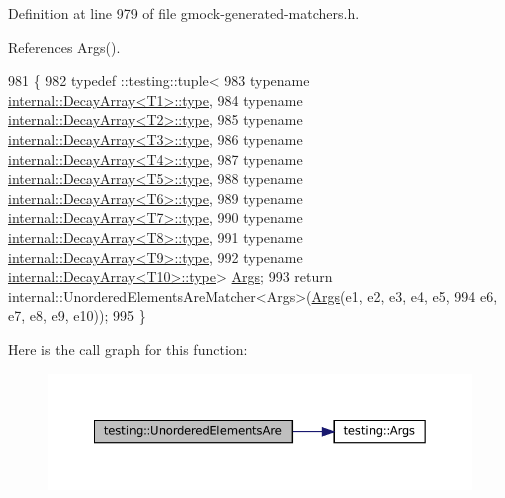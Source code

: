 Definition at line 979 of file gmock-\/generated-\/matchers.\+h.



References Args().


\begin{DoxyCode}
981                     \{
982   typedef ::testing::tuple<
983       \textcolor{keyword}{typename} \hyperlink{namespacegenerate__debs_a50bc9a7ecac9584553e089a448bcde58}{internal::DecayArray<T1>::type},
984       \textcolor{keyword}{typename} \hyperlink{namespacegenerate__debs_a50bc9a7ecac9584553e089a448bcde58}{internal::DecayArray<T2>::type},
985       \textcolor{keyword}{typename} \hyperlink{namespacegenerate__debs_a50bc9a7ecac9584553e089a448bcde58}{internal::DecayArray<T3>::type},
986       \textcolor{keyword}{typename} \hyperlink{namespacegenerate__debs_a50bc9a7ecac9584553e089a448bcde58}{internal::DecayArray<T4>::type},
987       \textcolor{keyword}{typename} \hyperlink{namespacegenerate__debs_a50bc9a7ecac9584553e089a448bcde58}{internal::DecayArray<T5>::type},
988       \textcolor{keyword}{typename} \hyperlink{namespacegenerate__debs_a50bc9a7ecac9584553e089a448bcde58}{internal::DecayArray<T6>::type},
989       \textcolor{keyword}{typename} \hyperlink{namespacegenerate__debs_a50bc9a7ecac9584553e089a448bcde58}{internal::DecayArray<T7>::type},
990       \textcolor{keyword}{typename} \hyperlink{namespacegenerate__debs_a50bc9a7ecac9584553e089a448bcde58}{internal::DecayArray<T8>::type},
991       \textcolor{keyword}{typename} \hyperlink{namespacegenerate__debs_a50bc9a7ecac9584553e089a448bcde58}{internal::DecayArray<T9>::type},
992       \textcolor{keyword}{typename} \hyperlink{namespacegenerate__debs_a50bc9a7ecac9584553e089a448bcde58}{internal::DecayArray<T10>::type}> 
      \hyperlink{namespacetesting_a09ac462e8d6ed468cbfaa9c767aee0aa}{Args};
993   \textcolor{keywordflow}{return} internal::UnorderedElementsAreMatcher<Args>(\hyperlink{namespacetesting_a09ac462e8d6ed468cbfaa9c767aee0aa}{Args}(e1, e2, e3, e4, e5,
994       e6, e7, e8, e9, e10));
995 \}
\end{DoxyCode}
Here is the call graph for this function\+:
\nopagebreak
\begin{figure}[H]
\begin{center}
\leavevmode
\includegraphics[width=350pt]{namespacetesting_ae0e6c9754b17623a64358da8d38c4d13_cgraph}
\end{center}
\end{figure}
\mbox{\label{namespacetesting_ab4896081406209171a1596b7028e1cf7}} 
